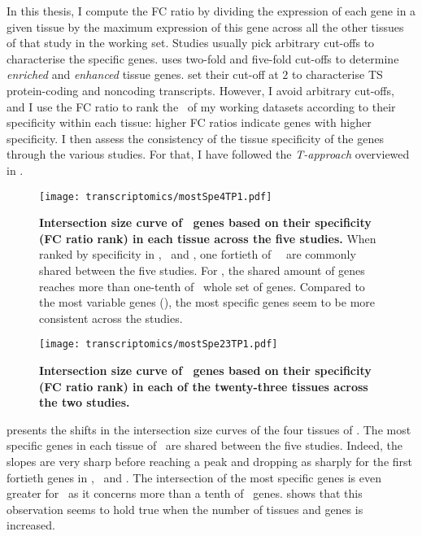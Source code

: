 In this thesis,
I compute the FC ratio by dividing the expression
of each gene in a given tissue
by the maximum expression of this gene across all the other tissues of that study
in the working set.
Studies usually pick arbitrary cut-offs to characterise the specific genes.
\citet{Uhlen2015} uses two-fold and five-fold cut-offs
to determine \emph{enriched} and \emph{enhanced} tissue genes.
\citet{Zhu2016-xo} set their cut-off at $2$ to characterise \gls{TS} protein-coding
and noncoding transcripts.
However,
I avoid arbitrary cut-offs, and
I use the FC ratio to rank the \pcgs\ of my working datasets according
to their specificity within each tissue:
higher FC ratios indicate genes with higher specificity.
I then assess the consistency of the tissue specificity of the genes through the
various studies.
For that, I have followed the \emph{T-approach} overviewed in .\mybr\

\begin{figure}[!pthb]
    \texttt{[image: transcriptomics/mostSpe4TP1.pdf]}\centering
    \vspace{-0.2in}
    \caption[Intersection size curve of \setOne\ genes based on their FC ratio
    rank in each tissue across the five studies]{\label{fig:mostSpe4T}\textbf{Intersection
    size curve of \setOne\ genes based on their specificity (FC ratio rank)
    in each tissue across the five studies.}
    When ranked by specificity in \heart, \kidney\ and \liver,
    one fortieth of \setOne\ \pcgs\ are commonly shared between the five studies.
    For \testis, the shared amount of genes reaches more than one-tenth of \setOne\
    whole set of genes.
    Compared to the most variable genes (),
    the most specific genes seem to be more consistent across the studies.
    }
\end{figure}
\begin{figure}[!pbht]
    \texttt{[image: transcriptomics/mostSpe23TP1.pdf]}\centering
    \vspace{-0.2in}
    \caption[Intersection size curve of \setTwo\ genes based on their FC ratio
    rank in each tissue across the two studies]{\label{fig:mostSpe23T}\textbf{Intersection
    size curve of \setTwo\ genes based on their specificity (FC ratio rank)
    in each of the twenty-three tissues across the two studies.}
    }
\end{figure}

 presents the shifts in the intersection size curves of the
four tissues of \setOne.
The most specific genes in each tissue of \setOne\ are shared between the
five studies.
Indeed, the slopes are very sharp before reaching a peak and dropping as sharply
for the first fortieth genes in \heart, \kidney\ and \liver.
The intersection of the most specific genes is even greater for \testis\ as
it concerns more than a tenth of \setOne\ genes.
 shows that this observation seems to hold true
when the number of tissues and genes is increased.\mybr\


